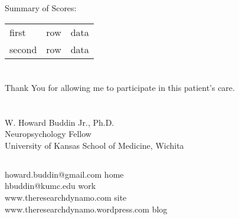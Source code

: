 \documentclass[12pt]{article}
\begin{document}
Summary of Scores: 
\begin{table}[!th]
\begin{tabular}{|l|c|r|}
\hline
first & row & data \\
second & row & data \\
\hline
\end{tabular}
\end{table}

\section*{}
Thank You for allowing me to participate in this patient's care.
\section*{}
W. Howard Buddin Jr., Ph.D. \\
Neuropsychology Fellow \\
University of Kansas School of Medicine, Wichita \\
\subsection*{}
\begin{flushright}
howard.buddin@gmail.com home \\
hbuddin@kumc.edu work \\
www.theresearchdynamo.com site \\
www.theresearchdynamo.wordpress.com blog \\
\end{flushright}
\end{document}

